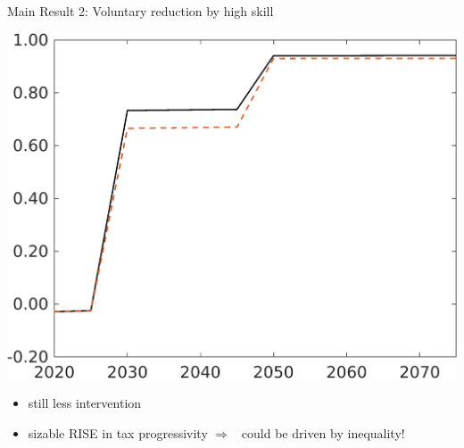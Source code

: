 \documentclass[11pt,aspectratio=169]{beamer}
\newcommand{\ar}{$\Rightarrow$ \ }
\begin{document}
\begin{frame}{Main Result 2: Voluntary reduction by high skill}
\begin{minipage}[]{0.32\textwidth}
\end{minipage}
	\begin{minipage}[]{0.32\textwidth}
		\includegraphics[width=1\textwidth]{../codding_model/own_basedOnFried/optimalPol_elastS_DisuSci/figures/all_1705/Single_OPT_T_NoTaus_tauf_spillover0_sep1_BN1_ineq1_redCOMP_etaa0.79_lgd0.png}
	\end{minipage}
	\begin{itemize}
		\item still less intervention
		\item sizable RISE in tax progressivity \ar could be driven by inequality!
	\end{itemize}
\end{frame}
\end{document}
